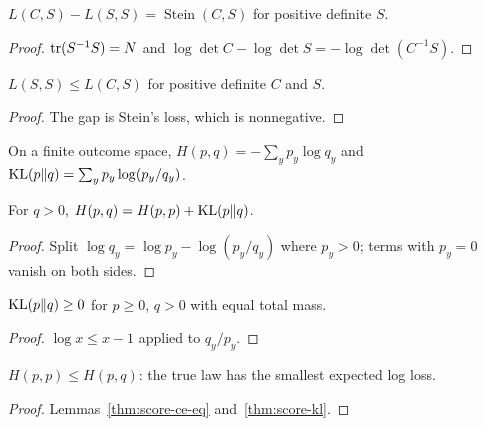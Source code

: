 \begin{lemma}\label{thm:score-loss-sub}
  \leanok
  $L(C,S)-L(S,S)=\operatorname{Stein}(C,S)$ for positive definite $S$.
\end{lemma}
\begin{proof}\leanok
  $\operatorname{tr}(S^{-1}S)=N$ and $\log\det C-\log\det S=-\log\det(C^{-1}S)$.
\end{proof}

\begin{theorem}\label{thm:score-proper}
  \leanok
  $L(S,S)\le L(C,S)$ for positive definite $C$ and $S$.
\end{theorem}
\begin{proof}\leanok
  The gap is Stein's loss, which is nonnegative.
\end{proof}

\begin{definition}\label{def:score-entropy}
  \leanok
  On a finite outcome space, $H(p,q)=-\sum_y p_y\log q_y$ and
  $\operatorname{KL}(p\Vert q)=\sum_y p_y\log(p_y/q_y)$.
\end{definition}

\begin{lemma}\label{thm:score-ce-eq}
  \leanok
  For $q>0$, $H(p,q)=H(p,p)+\operatorname{KL}(p\Vert q)$.
\end{lemma}
\begin{proof}\leanok
  Split $\log q_y=\log p_y-\log(p_y/q_y)$ where $p_y>0$; terms with $p_y=0$
  vanish on both sides.
\end{proof}

\begin{lemma}\label{thm:score-kl}
  \leanok
  $\operatorname{KL}(p\Vert q)\ge0$ for $p\ge0$, $q>0$ with equal total mass.
\end{lemma}
\begin{proof}\leanok
  $\log x\le x-1$ applied to $q_y/p_y$.
\end{proof}

\begin{theorem}\label{thm:score-log-proper}
  \leanok
  $H(p,p)\le H(p,q)$: the true law has the smallest expected log loss.
\end{theorem}
\begin{proof}\leanok
  Lemmas~\ref{thm:score-ce-eq} and~\ref{thm:score-kl}.
\end{proof}


